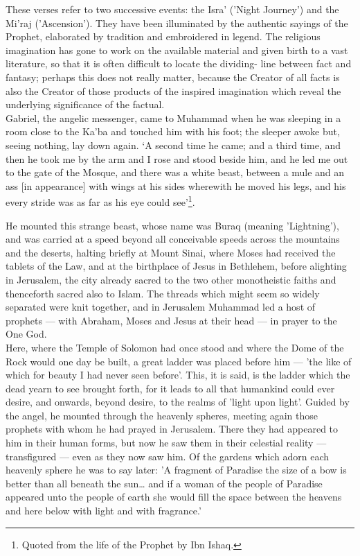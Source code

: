 \documentclass[10pt, twoside,openright]{book}
\begin{document}
These verses refer to two successive events: the Isra' ('Night Journey') and the Mi'raj 
('Ascension'). They have been illuminated by the authentic sayings of the Prophet, elaborated by 
tradition and embroidered in legend. The religious imagination has gone to work on the available 
material and given birth to a vast literature, so that it is often difficult to locate the dividing\hyp{}
line between fact and fantasy; perhaps this does not really matter, because the Creator of all facts 
is also the Creator of those products of the inspired imagination which reveal the underlying 
significance of the factual. \\

Gabriel, the angelic messenger, came to Muhammad when he was sleeping in a room close to the Ka'ba 
and touched him with his foot; the sleeper awoke but, seeing nothing, lay down again. `A second time 
he came; and a third time, and then he took me by the arm and I rose and stood beside him, and he led 
me out to the gate of the Mosque, and there was a white beast, between a mule and an ass [in 
appearance] with wings at his sides wherewith he moved his legs, and his every stride was as far as 
his eye could see'\footnote{Quoted from the life of the Prophet by Ibn Ishaq.}.

He mounted this strange beast, whose name was Buraq (meaning 'Lightning'), and was carried at a speed 
beyond all conceivable speeds across the mountains and the deserts, halting briefly at Mount Sinai, 
where Moses had received the tablets of the Law, and at the birthplace of Jesus in Bethlehem, before 
alighting in Jerusalem, the city already sacred to the two other monotheistic faiths and thenceforth 
sacred also to Islam. The threads which might seem so widely separated were knit together, and in 
Jerusalem Muhammad led a host of prophets --- with Abraham, Moses and Jesus at their head --- in prayer to the One God. \\

Here, where the Temple of Solomon had once stood and where the Dome of the Rock would one day be 
built, a great ladder was placed before him --- 'the like of which for beauty I had never seen before'. 
This, it is said, is the ladder which the dead yearn to see brought forth, for it leads to all that 
humankind could ever desire, and onwards, beyond desire, to the realms of 'light upon light'. Guided 
by the angel, he mounted through the heavenly spheres, meeting again those prophets with whom he had 
prayed in Jerusalem. There they had appeared to him in their human forms, but now he saw them in 
their celestial reality --- transfigured --- even as they now saw him. Of the gardens which adorn each 
heavenly sphere he was to say later: 'A fragment of Paradise the size of a bow is better than all 
beneath the sun\ldots{} and if a woman of the people of Paradise appeared unto the people of earth she 
would fill the space between the heavens and here below with light and with fragrance.' \\
\end{document}

